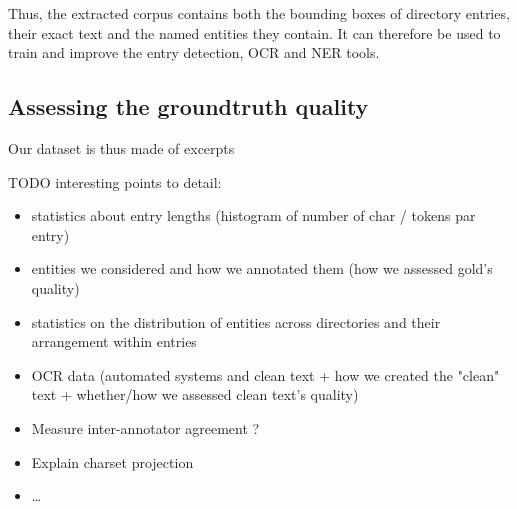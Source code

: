 Thus, the extracted corpus contains both the bounding boxes of directory entries, their exact text and the named entities they contain. It can therefore be used to train and improve the entry detection, OCR and NER tools.

\subsection{Assessing the groundtruth quality}

Our dataset is thus made of excerpts 

TODO interesting points to detail:
\begin{itemize}
    \item statistics about entry lengths (histogram of number of char / tokens par entry)
    \item entities we considered and how we annotated them (how we assessed gold's quality)
    \item statistics on the distribution of entities across directories and their arrangement within entries
    \item OCR data (automated systems and clean text + how we created the "clean" text + whether/how we assessed clean text's quality)
    \item Measure inter-annotator agreement ? 
    \item Explain charset projection
    \item \dots
\end{itemize}
